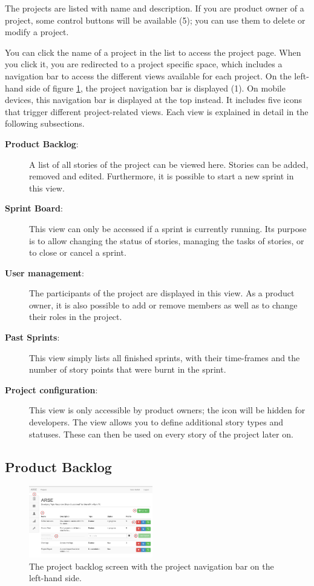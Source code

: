 \documentclass[
	accentcolor=tud1a %
]{tudreport}
\begin{document}
The projects are listed with name and description. If you are product owner of a project, some control buttons will be available (5); you can use them to delete or modify a project.

You can click the name of a project in the list to access the project page. When you click it, you are redirected to a project specific space, which includes a navigation bar to access the different views available for each project. On the left-hand side of figure \ref{fig:project-backlog}, the project navigation bar is displayed (1). On mobile devices, this navigation bar is displayed at the top instead. It includes five icons that trigger different project-related views. Each view is explained in detail in the following subsections.
\begin{description}
	\item[\textbf{Product Backlog}:] A list of all stories of the project can be viewed here. Stories can be added, removed and edited. Furthermore, it is possible to start a new sprint in this view.
	\item[\textbf{Sprint Board}:] This view can only be accessed if a sprint is currently running. Its purpose is to allow changing the status of stories, managing the tasks of stories, or to close or cancel a sprint.
	\item[\textbf{User management}:] The participants of the project are displayed in this view. As a product owner, it is also possible to add or remove members as well as to change their roles in the project.
	\item[\textbf{Past Sprints}:] This view simply lists all finished sprints, with their time-frames and the number of story points that were burnt in the sprint.
	\item[\textbf{Project configuration}:] This view is only accessible by product owners; the icon will be hidden for developers. The view allows you to define additional story types and statuses. These can then be used on every story of the project later on.
\end{description}


\subsection{Product Backlog}
\label{sec:backlog}


\begin{figure}
	\centering
	\includegraphics[width=0.48\textwidth]{img/backlog}
	\caption{The project backlog screen with the project navigation bar on the left-hand side.}
	\label{fig:project-backlog}
\end{figure}
\end{document}
